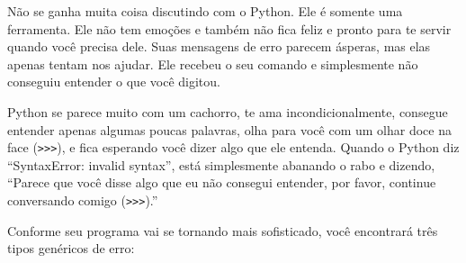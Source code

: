 
Não se ganha muita coisa discutindo com o Python. Ele é somente uma ferramenta.
Ele não tem emoções e também não fica feliz e pronto para te servir quando você
precisa dele. Suas mensagens de erro parecem ásperas, mas elas apenas tentam nos
ajudar. Ele recebeu o seu comando e simplesmente não conseguiu entender
o que você digitou.
%

Python se parece muito com um cachorro, te ama incondicionalmente, consegue
entender apenas algumas poucas palavras, olha para você com um olhar doce na
face ({\tt >>>}), e fica esperando você dizer algo que ele entenda.
Quando o Python diz ``SyntaxError: invalid syntax'', está simplesmente
abanando o rabo e dizendo, ``Parece que você disse algo que eu não consegui
entender, por favor, continue conversando comigo ({\tt >>>}).''
%

Conforme seu programa vai se tornando mais sofisticado, você encontrará três
tipos genéricos de erro:
%

